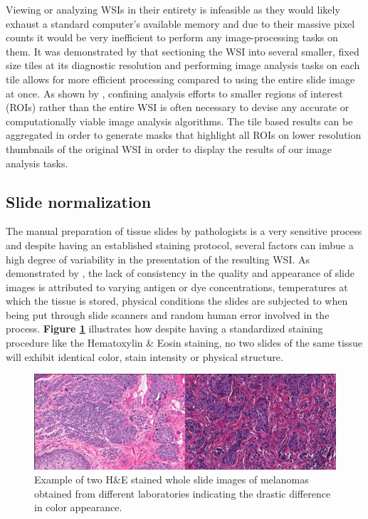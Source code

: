 \documentclass{l4proj}
\begin{document}
Viewing or analyzing WSIs in their entirety is infeasible as they would likely exhaust a standard computer's available memory and due to their massive pixel counts it would be very inefficient to perform any image-processing tasks on them. It was demonstrated by \cite{wang2012managing} that sectioning the WSI into several smaller, fixed size tiles at its diagnostic resolution and performing image analysis tasks on each tile allows for more efficient processing compared to using the entire slide image at once. As shown by \cite{aeffner2019introduction}, confining analysis efforts to smaller regions of interest (ROIs) rather than the entire WSI is often necessary to devise any accurate or computationally viable image analysis algorithms. The tile based results can be aggregated in order to generate masks that highlight all ROIs on lower resolution thumbnails of the original WSI in order to display the results of our image analysis tasks. 

\subsection{Slide normalization} \label{slide-normalization-background}
The manual preparation of tissue slides by pathologists is a very sensitive process and despite having an established staining protocol, several factors can imbue a high degree of variability in the presentation of the resulting WSI. As demonstrated by \cite{anghel2019high}, the lack of consistency in the quality and appearance of slide images is attributed to varying antigen or dye concentrations, temperatures at which the tissue is stored, physical conditions the slides are subjected to when being put through slide scanners and random human error involved in the process. \textbf{Figure \ref{fig:he-stain-difference}} illustrates how despite having a standardized staining procedure like the Hematoxylin \& Eosin staining, no two slides of the same tissue will exhibit identical color, stain intensity or physical structure.   

\begin{figure}[h]
\centering
\includegraphics[scale=0.5]{images/stain-difference-slide.png}
\caption{Example of two H\&E stained whole slide images of melanomas obtained from different laboratories indicating the drastic difference in color appearance.}
\label{fig:he-stain-difference}
\end{figure}
\end{document}
